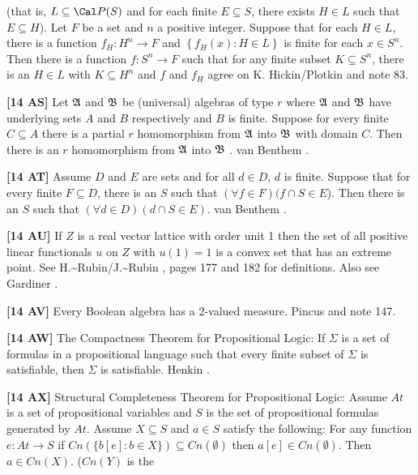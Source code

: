 (that is,  $L\subseteq\Cal P(S)$ and for each finite $E\subseteq S$,
there exists $H\in L$ such that $E\subseteq H$). Let $F$ be a set and
$n$ a positive integer. Suppose that for each $H\in L$, there is a
function $f_{H}: H^{n}\rightarrow F$ and $\left\{f_{H}(x): H\in L\right\}$
is finite for each $x\in S^{n}$. Then there is a function $f:
S^{n}\rightarrow F$ such that for any finite subset $K\subseteq S^{n}$,
there is an $H\in L$ with $K \subseteq H^{n}$ and $f$ and $f_{H}$ agree
on K. \ac{Hickin/Plotkin} \cite{1976} and note 83.
\smallskip
\item{}{\bf [14 AS]}  Let $\frak A$  and $\frak B$  be (universal)
algebras of type $r$ where  $\frak A$ and $\frak B$  have underlying
sets  $A$  and $B$  respectively  and $B$  is finite.  Suppose for
every finite $C \subseteq  A$ there is  a  partial $r$ homomorphism
from $\frak A$ into $\frak B$ with domain $C$.  Then there is  an $r$
homomorphism from $\frak A$ into $\frak B$ . van \ac{Benthem} \cite{1975}.
\smallskip
\item{}{\bf [14 AT]}  Assume $D$ and $E$ are sets and for all $d\in
D$, $d$  is finite.  Suppose that for every finite $F\subseteq D$, there
is an $S$ such that $(\forall f\in F)(f\cap S\in E$). Then there is an
$S$ such that $(\forall d\in D)(d\cap S\in E)$.  van \ac{Benthem}
\cite{1975}.
\smallskip
\item{}{\bf [14 AU]}  If $Z$ is a real vector lattice with order unit 1
then the set of all positive linear functionals $u$ on $Z$ with $u(1) =
1$ is a convex set that  has  an  extreme  point. See \ac{H.~Rubin/J.~Rubin}
\cite{1985}, pages 177 and 182 for definitions.   Also  see
\ac{Gardiner} \cite{1974}.
\smallskip
\item{}{\bf [14 AV]}  Every Boolean algebra has a 2-valued  measure.
\ac{Pincus} \cite{1972c} and note 147.
\smallskip
\item{}{\bf [14 AW]} The Compactness Theorem for Propositional Logic:
If $\Sigma$ is a set of formulas in a propositional language such that
every finite subset of $\Sigma$ is satisfiable, then $\Sigma$ is
satisfiable.  \ac{Henkin} \cite{1954b}.
\smallskip
\item{}{\bf [14 AX]} Structural Completeness Theorem for Propositional
Logic:  Assume $At$ is a set of propositional variables and $S$
is the set of propositional formulas generated by $At$.  Assume
$X\subseteq S$ and $a\in S$ satisfy the following:  For any function
$e: At\rightarrow S$ if $Cn(\{ b[e]: b\in X\})\subseteq Cn(\emptyset)$
then $a[e]\in Cn(\emptyset)$.  Then $a\in Cn(X)$. ($Cn(Y)$ is the
